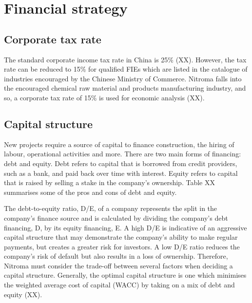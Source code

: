 \section{Financial strategy}
\subsection{Corporate tax rate}
\label{sec:tax}
The standard corporate income tax rate in China is 25\% (XX). However, the tax rate can be reduced to 15\% for qualified FIEs which are listed in the catalogue of industries encouraged by the Chinese Ministry of Commerce. Nitroma falls into the encouraged chemical raw material and products manufacturing industry, and so, a corporate tax rate of 15\% is used for economic analysis (XX).

\subsection{Capital structure}
\label{sec:de-ratio}
New projects require a source of capital to finance construction, the hiring of labour, operational activities and more. There are two main forms of financing: debt and equity. Debt refers to capital that is borrowed from credit providers, such as a bank, and paid back over time with interest. Equity refers to capital that is raised by selling a stake in the company’s ownership. Table XX summarises some of the pros and cons of debt and equity.

The debt-to-equity ratio, D/E, of a company represents the split in the company’s finance source and is calculated by dividing the company’s debt financing, D, by its equity financing, E. A high D/E is indicative of an aggressive capital structure that may demonstrate the company’s ability to make regular payments, but creates a greater risk for investors. A low D/E ratio reduces the company’s risk of default but also results in a loss of ownership. Therefore, Nitroma must consider the trade-off between several factors when deciding a capital structure. Generally, the optimal capital structure is one which minimises the weighted average cost of capital (WACC) by taking on a mix of debt and equity (XX).


